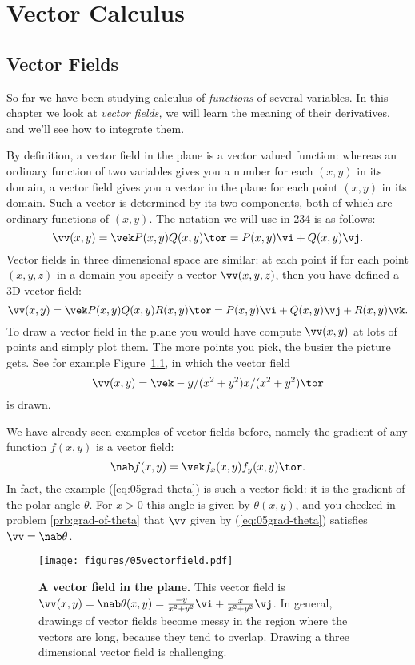 \chapter{Vector Calculus}  

\section{Vector Fields}   
So far we have been studying calculus of \textit{functions} of several
variables.   In this chapter we look at \emph{vector fields,} we will learn
the meaning of their derivatives, and we'll see how to integrate them.

By definition, a vector field in the plane is a vector valued function:
whereas an ordinary function of two variables gives you a number for each
$(x, y)$ in its domain, a vector field gives you a vector in the plane
for each point $(x,y)$ in its domain.   Such a vector is determined by its
two components, both of which are ordinary functions of $(x, y)$.   The
notation we will use in 234 is as follows:
\begin{equation}
  \vv(x, y) = \vek P(x, y) \\ Q(x, y)\tor = 
  P(x,y) \vi + Q(x, y) \vj.
  \label{eq:05vectorfield-notation}
\end{equation}
Vector fields in three dimensional space are similar: at each point if for
each point $(x, y, z)$ in a domain you specify a vector $\vv(x, y, z)$,
then you have defined a 3D vector field:
\[
\vv(x, y) = \vek P(x, y) \\ Q(x, y) \\ R(x, y)\tor = 
P(x,y) \vi + Q(x, y) \vj + R(x, y)\vk.
\]
To draw a vector field in the plane you would have compute $\vv(x, y)$ at
lots of points and simply plot them.   The more points you pick, the busier
the picture gets.   See for example Figure~\ref{fig:05grad-theta}, in which
the vector field
\begin{equation}\label{eq:05grad-theta}
  \vv(x, y) = \vek -y / (x^2+y^2)\\ x/(x^2+y^2) \tor
\end{equation}
is drawn.

We have already seen examples of vector fields before, namely the gradient
of any function $f(x, y)$ is a vector field:
\[
\nab f(x, y) = \vek f_x(x, y) \\ f_y(x, y)\tor.
\]
In fact, the example (\ref{eq:05grad-theta}) is such a vector field: it is
the gradient of the polar angle $\theta$.  For $x>0$ this angle is given by
$\theta(x, y)$, and you checked in problem \ref{prb:grad-of-theta} that
$\vv$ given by (\ref{eq:05grad-theta}) satisfies $\vv = \nab \theta$.
\begin{figure}[t]
  \texttt{[image: figures/05vectorfield.pdf]}
  \caption{\textbf{A vector field in the plane.}  This vector field is
    $\vv(x, y) = \nab \theta(x, y) = \frac{-y}{x^2+y^2}\vi +
    \frac{x}{x^2+y^2}\vj$.   In general, drawings of vector fields become
    messy in the region where the vectors are long, because they tend to
    overlap.   Drawing a three dimensional vector field is challenging.}
  \label{fig:05grad-theta}
\end{figure}


